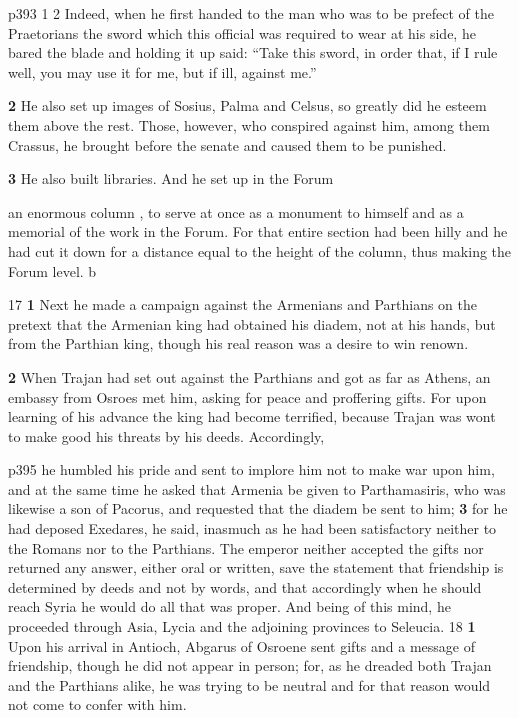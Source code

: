 p393
1 2 Indeed, when he first handed to the man who was to be prefect of the Praetorians the sword which this official was required to wear at his side, he bared the blade and holding it up said: ``Take this sword, in order that, if I rule well, you may use it for me, but if ill, against me.''

\textbf{2} He also set up images of Sosius, Palma and Celsus, so greatly did he esteem them above the rest. Those, however, who conspired against him, among them Crassus, he brought before the senate and caused them to be punished.

\textbf{3} He also built libraries. And he set up in the Forum

an enormous column , to serve at once as a monument to himself and as a memorial of the work in the Forum. For that entire section had been hilly and he had cut it down for a distance equal to the height of the column, thus making the Forum level.\texthebrew{⁠} b

17
\textbf{1} Next he made a campaign against the Armenians and Parthians on the pretext that the Armenian king had obtained his diadem, not at his hands, but from the Parthian king, though his real reason was a desire to win renown.

\textbf{2} When Trajan had set out against the Parthians and got as far as Athens, an embassy from Osroes met him, asking for peace and proffering gifts. For upon learning of his advance the king had become terrified, because Trajan was wont to make good his threats by his deeds. Accordingly,

p395 he humbled his pride and sent to implore him not to make war upon him, and at the same time he asked that Armenia be given to Parthamasiris, who was likewise a son of Pacorus, and requested that the diadem be sent to him; \textbf{3} for he had deposed Exedares, he said, inasmuch as he had been satisfactory neither to the Romans nor to the Parthians. The emperor neither accepted the gifts nor returned any answer, either oral or written, save the statement that friendship is determined by deeds and not by words, and that accordingly when he should reach Syria he would do all that was proper. And being of this mind, he proceeded through Asia, Lycia and the adjoining provinces to Seleucia.
18
\textbf{1} Upon his arrival in Antioch, Abgarus of Osroene sent gifts and a message of friendship, though he did not appear in person; for, as he dreaded both Trajan and the Parthians alike, he was trying to be neutral and for that reason would not come to confer with him.

